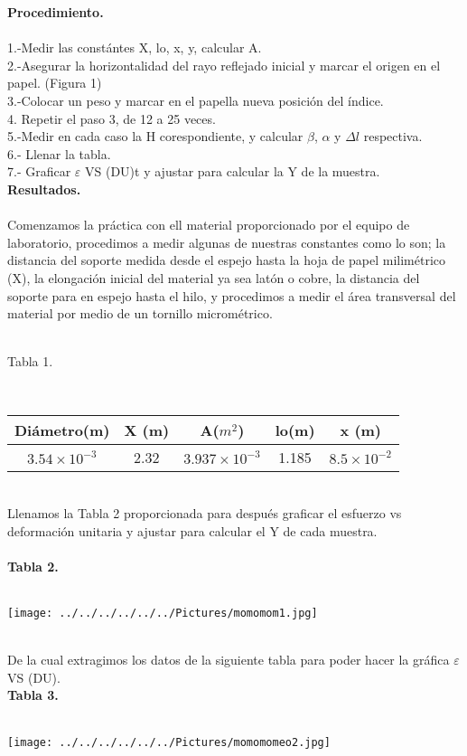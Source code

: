 \documentclass[10pt,a4paper]{article}
\begin{document}
\textbf{Procedimiento.}\\
\\
1.-Medir las const\'{a}ntes X, lo, x, y, calcular A.\\
2.-Asegurar la horizontalidad del rayo reflejado inicial y marcar el origen en el papel. (Figura 1)\\
3.-Colocar un peso y marcar en el papella nueva posici\'{o}n del \'{i}ndice. \\
4. Repetir el paso 3, de 12 a 25 veces.\\
5.-Medir en cada caso la H corespondiente, y calcular $\beta$, $\alpha$ y $\Delta l$ respectiva.\\
6.- Llenar la tabla.\\
7.- Graficar $\varepsilon$ VS (DU)t y ajustar para calcular la Y de la muestra.\\

\textbf{Resultados.}\\
\\
Comenzamos la pr\'{a}ctica con ell material proporcionado por el equipo de laboratorio, procedimos a medir algunas de nuestras constantes como lo son; la distancia del soporte medida desde el espejo hasta la hoja de papel milim\'{e}trico (X), la elongaci\'{o}n inicial del material ya sea lat\'{o}n o cobre, la distancia del soporte para en espejo hasta el hilo, y procedimos a medir el \'{a}rea transversal del material por medio de un tornillo microm\'{e}trico. \\
\medskip
\\
\medskip
\caption{Tabla 1.} 
\\ 
\begin{tabular}{|c|c|c|c|c|}
\hline 
Di\'{a}metro(m) & X (m) & A(${ m }^{ 2 }$) & lo(m)& x (m)\\ 
\hline 
${ 3.54\times 10 }^{ -3 }$ & 2.32 & ${ 3.937\times 10 }^{ -3 }$ & 1.185 &${ 8.5\times 10 }^{ -2 }$ \\
\hline 
\end{tabular}\\

\medskip
Llenamos la Tabla 2 proporcionada para despu\'{e}s graficar el esfuerzo vs deformaci\'{o}n unitaria y ajustar para calcular el Y de cada muestra.\\
\\
\textbf{Tabla 2.}\\
\\
\begin{figure 2}
\centering
\texttt{[image: ../../../../../../Pictures/momomom1.jpg]} 
\\
\end{figure 2}
\\
De la cual extragimos los datos de la siguiente tabla para poder hacer la gr\'{a}fica $\varepsilon$ VS (DU).
\\
\textbf{Tabla 3.}\\
\\
\begin{figure 3}
\centering
\texttt{[image: ../../../../../../Pictures/momomomeo2.jpg]}  
\\
\end{figure 3}
\\
\end{document}
